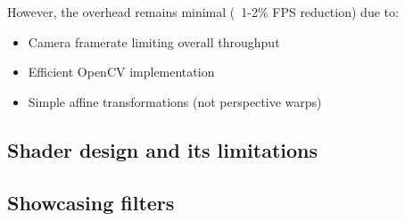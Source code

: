\documentclass[12pt,a4paper]{article}
\begin{document}
However, the overhead remains minimal (~1-2\% FPS reduction) due to:
\begin{itemize}
    \item Camera framerate limiting overall throughput
    \item Efficient OpenCV implementation
    \item Simple affine transformations (not perspective warps)
\end{itemize}

\subsection{Shader design and its limitations}

\subsection{Showcasing filters}
\end{document}

